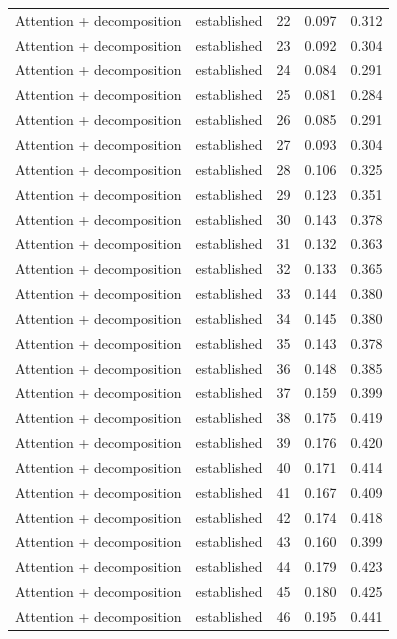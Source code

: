 \begin{tabular}{llrrr}
Attention + decomposition & established & 22 & 0.097 & 0.312 \\
Attention + decomposition & established & 23 & 0.092 & 0.304 \\
Attention + decomposition & established & 24 & 0.084 & 0.291 \\
Attention + decomposition & established & 25 & 0.081 & 0.284 \\
Attention + decomposition & established & 26 & 0.085 & 0.291 \\
Attention + decomposition & established & 27 & 0.093 & 0.304 \\
Attention + decomposition & established & 28 & 0.106 & 0.325 \\
Attention + decomposition & established & 29 & 0.123 & 0.351 \\
Attention + decomposition & established & 30 & 0.143 & 0.378 \\
Attention + decomposition & established & 31 & 0.132 & 0.363 \\
Attention + decomposition & established & 32 & 0.133 & 0.365 \\
Attention + decomposition & established & 33 & 0.144 & 0.380 \\
Attention + decomposition & established & 34 & 0.145 & 0.380 \\
Attention + decomposition & established & 35 & 0.143 & 0.378 \\
Attention + decomposition & established & 36 & 0.148 & 0.385 \\
Attention + decomposition & established & 37 & 0.159 & 0.399 \\
Attention + decomposition & established & 38 & 0.175 & 0.419 \\
Attention + decomposition & established & 39 & 0.176 & 0.420 \\
Attention + decomposition & established & 40 & 0.171 & 0.414 \\
Attention + decomposition & established & 41 & 0.167 & 0.409 \\
Attention + decomposition & established & 42 & 0.174 & 0.418 \\
Attention + decomposition & established & 43 & 0.160 & 0.399 \\
Attention + decomposition & established & 44 & 0.179 & 0.423 \\
Attention + decomposition & established & 45 & 0.180 & 0.425 \\
Attention + decomposition & established & 46 & 0.195 & 0.441 \\

\end{tabular}
